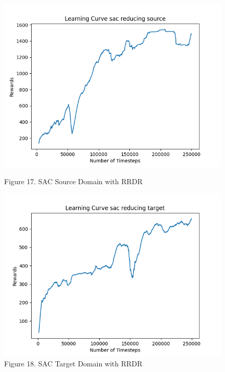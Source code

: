 \documentclass[12pt]{article}
\begin{document}
\begin{figure}[H]
    \centering
    \begin{minipage}{0.45\textwidth}
        \centering
        \includegraphics[width=\textwidth]{../images/Learning_Curve_SAC_Reducing_Source.png}
        \caption{Figure 17. SAC Source Domain with RRDR}
        \label{fig:sac_source_rrdr}
    \end{minipage}
    \hfill
    \begin{minipage}{0.45\textwidth}
        \centering
        \includegraphics[width=\textwidth]{../images/Learning_Curve_SAC_Reducing_Target.png}
        \caption{Figure 18. SAC Target Domain with RRDR}
        \label{fig:sac_target_rrdr}
    \end{minipage}

\end{figure}
\end{document}
